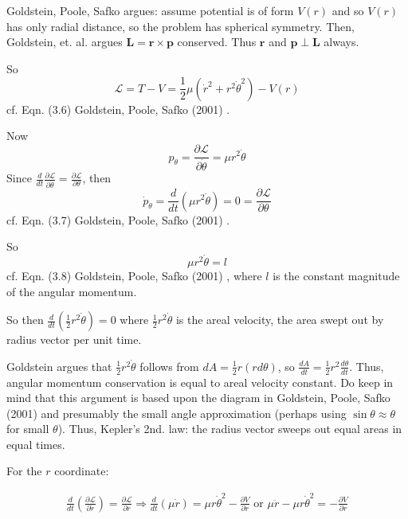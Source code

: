 Goldstein, Poole, Safko argues: assume potential is of form $V(r)$ and so $V(r)$ has only radial distance, so the problem has spherical symmetry. Then, Goldstein, et. al. argues $\mathbf{L} = \mathbf{r} \times \mathbf{p}$ conserved. Thus $\mathbf{r}$ and $\mathbf{p} \perp \mathbf{L}$ always. 

So 
\begin{equation}
\mathcal{L} = T- V = \frac{1}{2} \mu (\dot{r}^2 + r^2 \dot{\theta}^2 ) - V(r)
\end{equation}
cf. Eqn. (3.6) Goldstein, Poole, Safko (2001) \cite{dgdt:GPS2001}.

Now
\[
p_{\theta} = \frac{ \partial \mathcal{L} }{ \partial \dot{\theta}} = \mu r^2 \dot{\theta}
\]
Since $\frac{d}{dt} \frac{\partial \mathcal{L}}{ \partial \dot{\theta} } = \frac{\partial \mathcal{L}}{\partial \theta}$, then
\begin{equation}
\dot{p}_{\theta} = \frac{d}{dt} ( \mu r^2 \dot{\theta} ) = 0 = \frac{\partial \mathcal{L}}{\partial \theta}
\end{equation}
cf. Eqn. (3.7)  Goldstein, Poole, Safko (2001) \cite{dgdt:GPS2001}.

So 
\begin{equation}
\mu r^2 \dot{\theta} = l
\end{equation}
cf. Eqn. (3.8)  Goldstein, Poole, Safko (2001) \cite{dgdt:GPS2001}, where $l$ is the constant magnitude of the angular momentum.

So then $\frac{d}{dt} \left( \frac{1}{2} r^2 \dot{\theta} \right) = 0$ where $\frac{1}{2} r^2 \dot{\theta}$ is the areal velocity, the area swept out by radius vector per unit time.

Goldstein argues that $\frac{1}{2} r^2 \dot{\theta}$ follows from $dA = \frac{1}{2} r(rd\theta)$, so $\frac{dA}{dt} = \frac{1}{2} r^2 \frac{d\theta}{dt}$. Thus, angular momentum conservation is equal to areal velocity constant. Do keep in mind that this argument is based upon the diagram in  Goldstein, Poole, Safko (2001) \cite{dgdt:GPS2001} and presumably the small angle approximation (perhaps using $\sin{\theta} \approx \theta$ for small $\theta$). Thus, Kepler's 2nd. law: the radius vector sweeps out equal areas in equal times.

For the $r$ coordinate:

\[
\begin{gathered}
\frac{d}{dt} \left( \frac{ \partial \mathcal{L} }{ \partial \dot{r}} \right) = \frac{\partial \mathcal{L}}{\partial r} \Longrightarrow \frac{d}{dt} ( \mu \dot{r} ) = \mu r\dot{\theta}^2 - \frac{\partial V}{\partial r} \text{ or } \mu \ddot{r} - \mu r \dot{\theta}^2 = -\frac{\partial V}{\partial r}
\end{gathered}
\]

